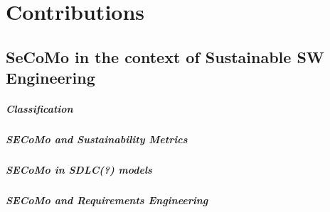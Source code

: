 \chapter{Contributions}

\section{SeCoMo in the context of Sustainable SW Engineering}
\paragraph{Classification}




\paragraph{SECoMo and Sustainability Metrics}


\paragraph{SECoMo in SDLC(?) models}


\paragraph{SECoMo and Requirements Engineering}







